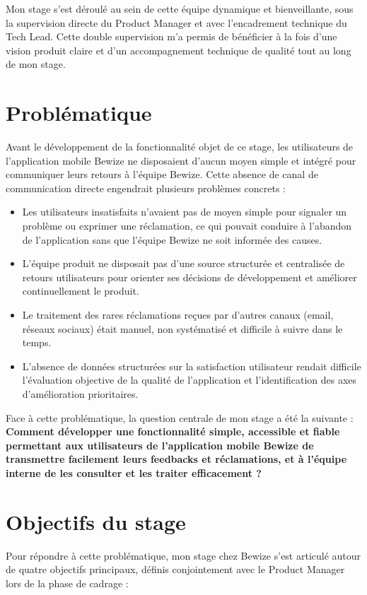 Mon stage s'est déroulé au sein de cette équipe dynamique et bienveillante, 
sous la supervision directe du Product Manager et avec l'encadrement 
technique du Tech Lead. Cette double supervision m'a permis de bénéficier 
à la fois d'une vision produit claire et d'un accompagnement technique 
de qualité tout au long de mon stage.

\section{Problématique}
Avant le développement de la fonctionnalité objet de ce stage, les 
utilisateurs de l'application mobile Bewize ne disposaient d'aucun 
moyen simple et intégré pour communiquer leurs retours à l'équipe Bewize. 
Cette absence de canal de communication directe engendrait plusieurs 
problèmes concrets :

\begin{itemize}
    \item Les utilisateurs insatisfaits n'avaient pas de moyen simple 
    pour signaler un problème ou exprimer une réclamation, ce qui 
    pouvait conduire à l'abandon de l'application sans que l'équipe 
    Bewize ne soit informée des causes.
    
    \item L'équipe produit ne disposait pas d'une source structurée 
    et centralisée de retours utilisateurs pour orienter ses décisions 
    de développement et améliorer continuellement le produit.
    
    \item Le traitement des rares réclamations reçues par d'autres 
    canaux (email, réseaux sociaux) était manuel, non systématisé 
    et difficile à suivre dans le temps.
    
    \item L'absence de données structurées sur la satisfaction 
    utilisateur rendait difficile l'évaluation objective de la qualité 
    de l'application et l'identification des axes d'amélioration prioritaires.
\end{itemize}

Face à cette problématique, la question centrale de mon stage a été 
la suivante : \textbf{Comment développer une fonctionnalité simple, 
accessible et fiable permettant aux utilisateurs de l'application 
mobile Bewize de transmettre facilement leurs feedbacks et réclamations, 
et à l'équipe interne de les consulter et les traiter efficacement ?}

\section{Objectifs du stage}
Pour répondre à cette problématique, mon stage chez Bewize s'est 
articulé autour de quatre objectifs principaux, définis conjointement 
avec le Product Manager lors de la phase de cadrage :

